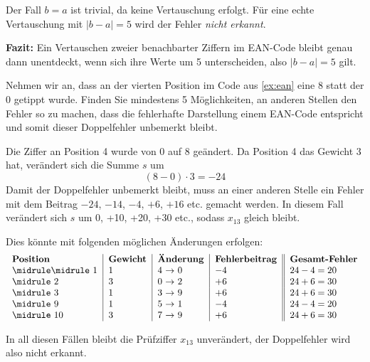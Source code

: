 \begin{myexercise}
\begin{mychallenge}
\begin{myanswer}
            Der Fall $b = a$ ist trivial, da keine Vertauschung erfolgt. Für eine echte Vertauschung mit $|b - a| = 5$ wird der Fehler \emph{nicht erkannt}.

            \medskip

            \textbf{Fazit:} Ein Vertauschen zweier benachbarter Ziffern im \gls{EAN}-Code bleibt genau dann unentdeckt, wenn sich ihre Werte um 5 unterscheiden, also $|b - a| = 5$ gilt.

        \end{myanswer}
    \end{mychallenge}



\end{myexercise}

\begin{myexercise}
    Nehmen wir an, dass an der vierten Position im Code aus \cref{ex:ean} eine 8 statt der 0 getippt wurde. Finden Sie mindestens 5 Möglichkeiten, an anderen Stellen den Fehler so zu machen, dass die fehlerhafte Darstellung einem \gls{EAN}-Code entspricht und somit dieser Doppelfehler unbemerkt bleibt.
    \begin{myanswer}
        Die Ziffer an Position 4 wurde von 0 auf 8 geändert. Da Position 4 das Gewicht 3 hat, verändert sich die Summe $s$ um
        \[
            (8-0) \cdot 3 = -24
        \]
        Damit der Doppelfehler unbemerkt bleibt, muss an einer anderen Stelle ein Fehler mit dem Beitrag $-24$, $-14$, $-4$, $+6$, $+16$ etc. gemacht werden. In diesem Fall verändert sich $s$ um 0, +10, +20, +30 etc., sodass $x_{13}$ gleich bleibt.

        Dies könnte mit folgenden möglichen Änderungen erfolgen:
        \[
            \begin{tabular}{l|l|l|l||l}
                \textbf{Position} & \textbf{Gewicht} & \textbf{Änderung} & \textbf{Fehlerbeitrag} & \textbf{Gesamt-Fehler} \\
                \midrule\midrule
                1                 & 1                & 4 $\rightarrow$ 0 & $-4$                   & $24-4=20$              \\\midrule
                2                 & 3                & 0 $\rightarrow$ 2 & $+6$                   & $24+6=30$              \\\midrule
                3                 & 1                & 3 $\rightarrow$ 9 & $+6$                   & $24+6=30$              \\\midrule
                9                 & 1                & 5 $\rightarrow$ 1 & $-4$                   & $24-4=20$              \\\midrule
                10                & 3                & 7 $\rightarrow$ 9 & $+6$                   & $24+6=30$              \\
            \end{tabular}
        \]

        In all diesen Fällen bleibt die Prüfziffer $x_{13}$ unverändert, der Doppelfehler wird also nicht erkannt.

    \end{myanswer}
\end{myexercise}

